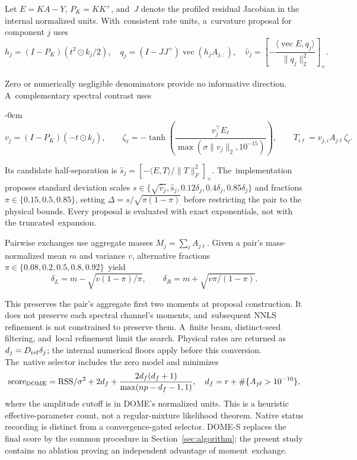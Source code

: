 \documentclass[mathematics,article,accept,moreauthors]{Definitions/mdpi}
\begin{document}
Let $E=KA-Y$, $P_K=KK^+$, and~$J$ denote the profiled residual Jacobian in the internal normalized units. With~consistent rate units, a~curvature proposal for component $j$ uses
\begin{equation}\label{eq:domecurvature}
 h_j=(I-P_K)(t^2\odot k_j/2),\quad
 q_j=(I-JJ^+)\operatorname{vec}(h_j A_{j,:}),\quad
 \widehat v_j=\left[-\frac{\langle\operatorname{vec}E,q_j\rangle}{\|q_j\|_2^2}\right]_+.
\end{equation}

Zero or numerically negligible denominators provide no informative direction. A~complementary spectral contrast uses
\begin{adjustwidth}{-\extralength}{0cm}
\begin{equation}\label{eq:domespectral}
 v_j=(I-P_K)(-t\odot k_j),\qquad
 \zeta_\ell=-\tanh\!\left(\frac{v_j^\top E_\ell}{\max(\sigma\|v_j\|_2,10^{-15})}\right),\qquad
 T_{i\ell}=v_{j,i}A_{j\ell}\zeta_\ell.
\end{equation}
\end{adjustwidth}

Its candidate half-separation is $\widehat s_j=[-\langle E,T\rangle/\|T\|_F^2]_+$. The~implementation proposes standard deviation scales $s\in\{\sqrt{\widehat v_j},\widehat s_j,0.12\delta_j,0.4\delta_j,0.85\delta_j\}$ and fractions\linebreak   $\pi\in\{0.15,0.5,0.85\}$, setting $\Delta=s/\sqrt{\pi(1-\pi)}$ before restricting the pair to the physical bounds. Every proposal is evaluated with exact exponentials, not with the \mbox{truncated~expansion.}

Pairwise exchanges use aggregate masses $M_j=\sum_\ell A_{j\ell}$. Given a pair's mass-normalized mean $m$ and variance $v$, alternative fractions \mbox{$\pi\in\{0.08,0.2,0.5,0.8,0.92\}$ yield}
\begin{equation}\label{eq:domeexchange}
 \delta_L=m-\sqrt{v(1-\pi)/\pi},\qquad \delta_R=m+\sqrt{v\pi/(1-\pi)}.
\end{equation}

This preserves the pair's aggregate first two moments at proposal construction. It does not preserve each spectral channel's moments, and~subsequent NNLS refinement is not constrained to preserve them. A~finite beam, distinct-seed filtering, and~local refinement limit the search. Physical rates are returned as $d_j=D_{\rm ref}\delta_j$; the internal numerical floors apply before this conversion. The~native selector includes the zero model and minimizes
\begin{equation}\label{eq:domescore}
 \mathrm{score}_{\rm DOME}=\mathrm{RSS}/\sigma^2+2d_f+
 \frac{2d_f(d_f+1)}{\max(np-d_f-1,1)},
 \quad d_f=r+\#\{A_{j\ell}>10^{-10}\},
\end{equation}
where the amplitude cutoff is in DOME's normalized units. This is a heuristic effective-parameter count, not a regular-mixture likelihood theorem. Native status recording is distinct from a convergence-gated selector. DOME-S replaces the final score by the common procedure in Section~\ref{sec:algorithm}; the present study contains no ablation proving an independent advantage of moment~exchange.
\end{document}
